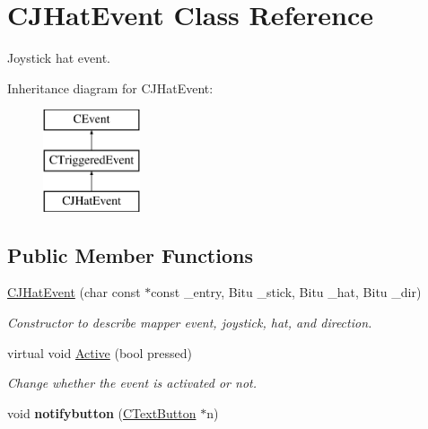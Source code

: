 \hypertarget{classCJHatEvent}{\section{C\-J\-Hat\-Event Class Reference}
\label{classCJHatEvent}
}


Joystick hat event.  


Inheritance diagram for C\-J\-Hat\-Event\-:\begin{figure}[H]
\begin{center}
\leavevmode
\includegraphics[height=3.000000cm]{classCJHatEvent}
\end{center}
\end{figure}
\subsection*{Public Member Functions}
\begin{DoxyCompactItemize}
\item 
\hypertarget{classCJHatEvent_a75c1276a13b233799993bb69bfbffedf}{\hyperlink{classCJHatEvent_a75c1276a13b233799993bb69bfbffedf}{C\-J\-Hat\-Event} (char const $\ast$const \-\_\-entry, Bitu \-\_\-stick, Bitu \-\_\-hat, Bitu \-\_\-dir)}\label{classCJHatEvent_a75c1276a13b233799993bb69bfbffedf}

\begin{DoxyCompactList}\small\item\em Constructor to describe mapper event, joystick, hat, and direction. \end{DoxyCompactList}\item 
\hypertarget{classCJHatEvent_ad4b66a30f706388e5568090963a22dee}{virtual void \hyperlink{classCJHatEvent_ad4b66a30f706388e5568090963a22dee}{Active} (bool pressed)}\label{classCJHatEvent_ad4b66a30f706388e5568090963a22dee}

\begin{DoxyCompactList}\small\item\em Change whether the event is activated or not. \end{DoxyCompactList}\item 
\hypertarget{classCJHatEvent_a45aec7b7ece627bc98e8c0609b4f811e}{void {\bfseries notifybutton} (\hyperlink{classCTextButton}{C\-Text\-Button} $\ast$n)}\label{classCJHatEvent_a45aec7b7ece627bc98e8c0609b4f811e}

\end{DoxyCompactItemize}
